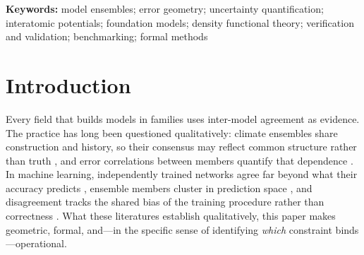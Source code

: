 \documentclass[11pt]{article}
\theoremstyle{remark}
\begin{document}
\begin{abstract}
DFT-PBE elastic anchor (round~2) is the decisive test that separates them. DFT
implementation errors, by contrast, cluster by pseudopotential table, not
simulation code ($S_{\mathrm{table}}{=}{+}0.526$ vs.\
$S_{\mathrm{code}}{=}{+}0.265$, $p{=}0.017$); four independent plane-wave codes
sharing one table align at $0.70$--$0.87$. Neither registered refutation
condition was triggered, but four of seven registered predictions failed and are
reported as failures.
Combined with the 559-potential classical baseline (within-family
reference--prediction correlation $0.95$; error dimensionality invariant over
forty years), error anisotropy is conserved across paradigm replacements while
its direction rotates to the next constraint upstream. A correction direction
fitted with the corrected model held out removes a median $69\%$ of
foundation-model squared elastic error out-of-sample (IQR $35$--$92\%$;
per-element medians up to $97\%$).
\textbf{Conclusion:} Agreement among models sharing a constraint measures the
constraint, not the truth. Error-vector geometry converts benchmarking from
scoring into diagnosis, supplies a zero-cost trust rule for ensemble
uncertainty, and enables family-level calibration without retraining.
\end{abstract}

\noindent\textbf{Keywords:} model ensembles; error geometry; uncertainty
quantification; interatomic potentials; foundation models; density functional
theory; verification and validation; benchmarking; formal methods

\section{Introduction}

Every field that builds models in families uses inter-model agreement as
evidence. The practice has long been questioned qualitatively: climate
ensembles share construction and history, so their consensus may reflect
common structure rather than truth \citep{pirtle2010,parker2011}, and error
correlations between members quantify that dependence
\citep{bishop2013,annan2011,knutti2013}. In machine learning, independently
trained networks agree far beyond what their accuracy predicts
\citep{mania2019,geirhos2020}, ensemble members cluster in prediction space
\citep{fort2019}, and disagreement tracks the shared bias of the training
procedure rather than correctness \citep{jiang2021}. What these literatures
establish qualitatively, this paper makes geometric, formal, and---in the
specific sense of identifying \emph{which} constraint binds---operational.
\end{document}
